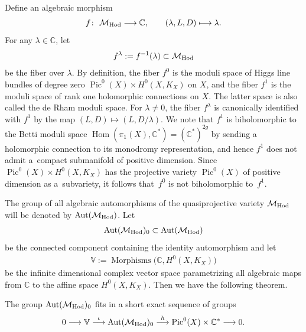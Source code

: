 Def\/ine an algebraic morphism
\begin{gather}\label{lf}
f \colon \ {\mathcal M}_{\rm Hod} \longrightarrow {\mathbb C} , \qquad (\lambda, L, D) \longmapsto \lambda .
\end{gather}
For any $\lambda \in \mathbb C$, let
\begin{gather*}%
f^\lambda := f^{-1}(\lambda) \subset {\mathcal M}_{\rm Hod}
\end{gather*}
be the f\/iber over $\lambda$. By def\/inition, the f\/iber $f^0$ is the moduli space of Higgs line bundles of degree zero $\operatorname{Pic}^0(X)\times H^0(X, K_X)$ on $X$, and the f\/iber $f^1$ is the moduli space of rank one holomorphic connections on $X$. The latter space is also called the de Rham moduli space. For $\lambda \not= 0$, the f\/iber $f^\lambda$ is canonically identif\/ied with $f^1$ by the map $(L, D) \longmapsto (L, D/\lambda)$. We note that $f^1$ is biholomorphic to the Betti moduli space $\operatorname{Hom}(\pi_1(X), {\mathbb C}^*) = ({\mathbb C}^*)^{2g}$ by sending a holomorphic connection to its monodromy representation, and hence $f^1$ does not admit a~compact submanifold of positive dimension. Since $\operatorname{Pic}^0(X)\times H^0(X, K_X)$ has the projective variety $\operatorname{Pic}^0(X)$ of positive dimension as a~subvariety, it follows that~$f^0$ is not biholomorphic to~$f^1$.

The group of all algebraic automorphisms of the quasiprojective variety
${\mathcal M}_{\rm Hod}$ will be denoted by $\operatorname{Aut}({\mathcal M}_{\rm Hod})$. Let
\begin{gather*}
\operatorname{Aut}({\mathcal M}_{\rm Hod})_0 \subset \operatorname{Aut}({\mathcal M}_{\rm Hod})
\end{gather*}
be the connected component containing the identity automorphism and
 let
\begin{gather*}
{\mathbb V} := \operatorname{Morphisms}\big({\mathbb C}, H^0(X, K_X)\big)
\end{gather*}
be the inf\/inite dimensional complex vector space parametrizing all algebraic maps from $\mathbb C$ to the af\/f\/ine space $H^0(X, K_X)$. Then we have the following theorem.
\begin{Theorem}\label{thm1}
The group $\operatorname{Aut}({\mathcal M}_{\rm Hod})_0$ fits in a short exact sequence of groups
\begin{gather*}
0 \longrightarrow {\mathbb V} \stackrel{\iota}{\longrightarrow} \operatorname{Aut}({\mathcal M}_{\rm Hod})_0 \stackrel{h}{\longrightarrow}
\operatorname{Pic}^0(X)\times {\mathbb C}^* \longrightarrow 0 .
\end{gather*}
\end{Theorem}

